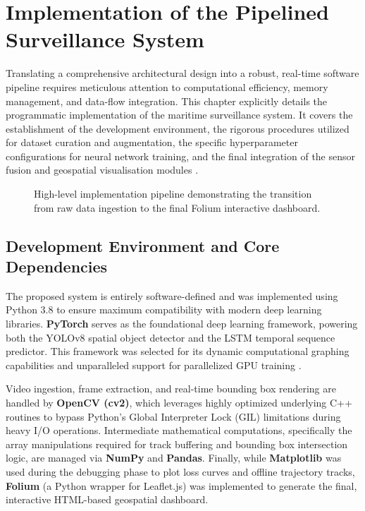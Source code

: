 \chapter{Implementation of the Pipelined Surveillance System}

Translating a comprehensive architectural design into a robust, real-time software pipeline requires meticulous attention to computational efficiency, memory management, and data-flow integration. This chapter explicitly details the programmatic implementation of the maritime surveillance system. It covers the establishment of the development environment, the rigorous procedures utilized for dataset curation and augmentation, the specific hyperparameter configurations for neural network training, and the final integration of the sensor fusion and geospatial visualisation modules \citep{Ref10}.

\begin{figure}[htb]
\centering
	\caption{High-level implementation pipeline demonstrating the transition from raw data ingestion to the final Folium interactive dashboard.}
	\label{fig:implementation_pipeline}
\end{figure}

\section{Development Environment and Core Dependencies}
The proposed system is entirely software-defined and was implemented using Python 3.8 to ensure maximum compatibility with modern deep learning libraries. \textbf{PyTorch} serves as the foundational deep learning framework, powering both the YOLOv8 spatial object detector and the LSTM temporal sequence predictor. This framework was selected for its dynamic computational graphing capabilities and unparalleled support for parallelized GPU training \citep{Ref11}.

Video ingestion, frame extraction, and real-time bounding box rendering are handled by \textbf{OpenCV (cv2)}, which leverages highly optimized underlying C++ routines to bypass Python's Global Interpreter Lock (GIL) limitations during heavy I/O operations. Intermediate mathematical computations, specifically the array manipulations required for track buffering and bounding box intersection logic, are managed via \textbf{NumPy} and \textbf{Pandas}. Finally, while \textbf{Matplotlib} was used during the debugging phase to plot loss curves and offline trajectory tracks, \textbf{Folium} (a Python wrapper for Leaflet.js) was implemented to generate the final, interactive HTML-based geospatial dashboard.

